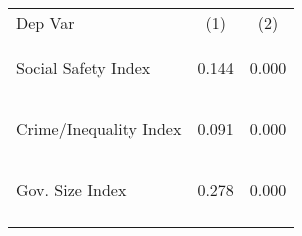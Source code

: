 \begin{center}
\begin{tabular}{lcc}
\hline \noalign{\smallskip}Dep Var & (1) & (2)\\
\noalign{\smallskip}\hline \noalign{\smallskip}Social Safety Index & \begin{scriptsize}0.144\end{scriptsize} & \begin{scriptsize}0.000\end{scriptsize}\\
Crime/Inequality Index & \begin{scriptsize}0.091\end{scriptsize} & \begin{scriptsize}0.000\end{scriptsize}\\
Gov. Size Index & \begin{scriptsize}0.278\end{scriptsize} & \begin{scriptsize}0.000\end{scriptsize}\\
\noalign{\smallskip}\hline\end{tabular}\\
\end{center}
